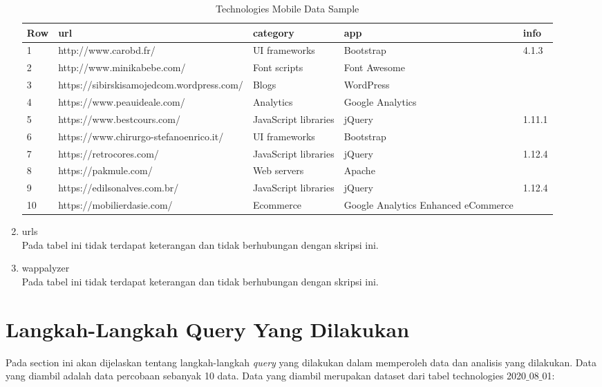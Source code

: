\begin{enumerate}
\begin{table}[H]
	\centering
	\begin{tabular}{|l|l|p{3cm}|p{3cm}|l|}
		\hline
		\textbf{Row} & \textbf{url} & \textbf{category} & app & info\\
		\hline
		1 & http://www.carobd.fr/ & UI frameworks & Bootstrap & 4.1.3\\
		\hline
		2 & http://www.minikabebe.com/ & Font scripts & Font Awesome & \\
		\hline
		3 & https://sibirskisamojedcom.wordpress.com/ & Blogs & WordPress & \\
		\hline
		4 & https://www.peauideale.com/ & Analytics & Google Analytics & \\
		\hline
		5 & https://www.bestcours.com/ & JavaScript libraries & jQuery & 1.11.1\\
		\hline
		6 & https://www.chirurgo-stefanoenrico.it/ & UI frameworks & Bootstrap & \\
		\hline
		7 & https://retrocores.com/ & JavaScript libraries & jQuery & 1.12.4\\
		\hline
		8 & https://pakmule.com/ & Web servers & Apache & \\
		\hline
		9 & https://edilsonalves.com.br/ & JavaScript libraries & jQuery & 1.12.4\\
		\hline
		10 & https://mobilierdasie.com/ & Ecommerce & Google Analytics Enhanced eCommerce & \\
		\hline
	\end{tabular}
	\caption{Technologies Mobile Data Sample}
	\label{table:ct_tech_mobile}
\end{table}


\item urls\\
Pada tabel ini tidak terdapat keterangan dan tidak berhubungan dengan skripsi ini.
\item wappalyzer\\
Pada tabel ini tidak terdapat keterangan dan tidak berhubungan dengan skripsi ini.
\end{enumerate}

\section{Langkah-Langkah Query Yang Dilakukan}
\label{langkah_query}
Pada section ini akan dijelaskan tentang langkah-langkah \textit{query} yang dilakukan dalam memperoleh data dan analisis yang dilakukan. Data yang diambil adalah data percobaan sebanyak 10 data. Data yang diambil merupakan dataset dari tabel technologies 2020$\_$08$\_$01:


